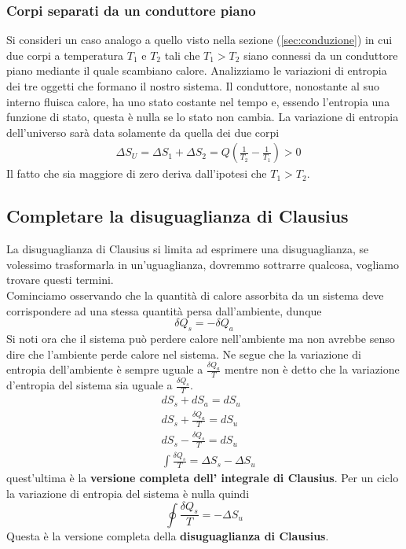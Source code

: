 \documentclass[
10pt, %
a4paper, %
oneside, %
headinclude,footinclude, %
BCOR5mm, %
]{scrartcl}
\begin{document}
\subsubsection*{Corpi separati da un conduttore piano}
Si consideri un caso analogo a quello visto nella sezione (\ref{sec:conduzione}) in cui due corpi a temperatura \(T_1\) e \(T_2\) tali che \(T_1 > T_2\) siano connessi da un conduttore piano mediante il quale scambiano calore. Analizziamo le variazioni di entropia dei tre oggetti che formano il nostro sistema. Il conduttore, nonostante al suo interno fluisca calore, ha uno stato costante nel tempo e, essendo l'entropia una funzione di stato, questa è nulla se lo stato non cambia. La variazione di entropia dell'universo sarà data solamente da quella dei due corpi 
\begin{align*}
	&\Delta S_U = \Delta S_1 + \Delta S_2 = Q\left(\frac{1}{T_2}-\frac{1}{T_1}\right)>0
\end{align*}
Il fatto che sia maggiore di zero deriva dall'ipotesi che \(T_1 > T_2\).

\subsection{Completare la disuguaglianza di Clausius}
La disuguaglianza di Clausius si limita ad esprimere una disuguaglianza, se volessimo trasformarla in un'uguaglianza, dovremmo sottrarre qualcosa, vogliamo trovare questi termini.\\
Cominciamo osservando che la quantità di calore assorbita da un sistema deve corrispondere ad una stessa quantità persa dall'ambiente, dunque
\[\delta Q_s = -\delta Q_a\]
Si noti ora che il sistema può perdere calore nell'ambiente ma non avrebbe senso dire che l'ambiente perde calore nel sistema. Ne segue che la variazione di entropia dell'ambiente è sempre uguale a \(\frac{\delta Q_a}{T}\) mentre non è detto che la variazione d'entropia del sistema sia uguale a \(\frac{\delta Q_s}{T}\). 
\begin{align*}
	&dS_s + dS_a = dS_u\\
	&dS_s + \frac{\delta Q_a}{T} = dS_u\\
	&dS_s - \frac{\delta Q_s}{T} =dS_u\\
	&\int\frac{\delta Q_s}{T} = \Delta S_s - \Delta S_u
\end{align*}
quest'ultima è la \textbf{versione completa dell' integrale di Clausius}. Per un ciclo la variazione di entropia del sistema è nulla quindi
\[\oint \frac{\delta Q_s}{T} = -\Delta S_u\]
Questa è la versione completa della \textbf{disuguaglianza di Clausius}.
\end{document}

